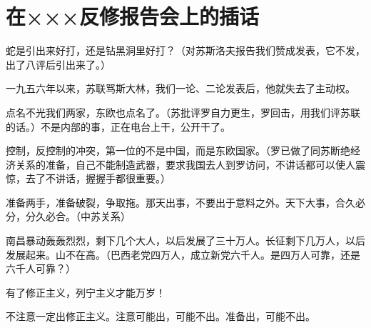 \section[在×××反修报告会上的插话（一九六四年九月四日）]{在×××反修报告会上的插话}


蛇是引出来好打，还是钻黑洞里好打？（对苏斯洛夫报告我们赞成发表，它不发，出了八评后引出来了。）

一九五六年以来，苏联骂斯大林，我们一论、二论发表后，他就失去了主动权。

点名不光我们两家，东欧也点名了。（苏批评罗自力更生，罗回击，用我们评苏联的话。）不是内部的事，正在电台上干，公开干了。

控制，反控制的冲突，第一位的不是中国，而是东欧国家。（罗已做了同苏断绝经济关系的准备，自己不能制造武器，要求我国去人到罗访问，不讲话都可以使人震惊，去了不讲话，握握手都很重要。）

准备两手，准备破裂，争取拖。那天出事，不要出于意料之外。天下大事，合久必分，分久必合。（中苏关系）

南昌暴动轰轰烈烈，剩下几个大人，以后发展了三十万人。长征剩下几万人，以后发展起来。山不在高。（巴西老党四万人，成立新党六千人。是四万人可靠，还是六千人可靠？）

有了修正主义，列宁主义才能万岁！

不注意一定出修正主义。注意可能出，可能不出。准备出，可能不出。


